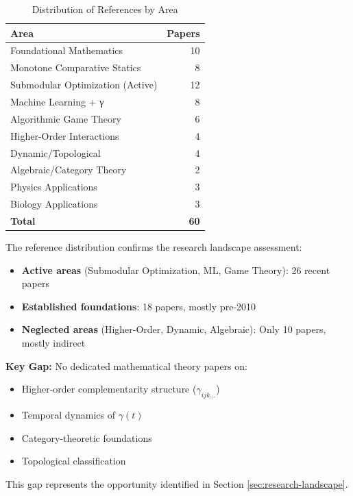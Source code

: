 \begin{table}[h]
\centering
\caption{Distribution of References by Area}
\label{tab:ref-distribution}
\renewcommand{\arraystretch}{1.2}
\begin{tabular}{@{}lr@{}}
\toprule
\textbf{Area} & \textbf{Papers} \\
\midrule
Foundational Mathematics & 10 \\
Monotone Comparative Statics & 8 \\
Submodular Optimization (Active) & 12 \\
Machine Learning + γ & 8 \\
Algorithmic Game Theory & 6 \\
Higher-Order Interactions & 4 \\
Dynamic/Topological & 4 \\
Algebraic/Category Theory & 2 \\
Physics Applications & 3 \\
Biology Applications & 3 \\
\midrule
\textbf{Total} & \textbf{60} \\
\bottomrule
\end{tabular}
\end{table}

\begin{tcolorbox}[colback=yellow!5!white,colframe=yellow!75!black,title=\textbf{Literature Gap Analysis}]
The reference distribution confirms the research landscape assessment:
\begin{itemize}[noitemsep]
    \item \textbf{Active areas} (Submodular Optimization, ML, Game Theory): 26 recent papers
    \item \textbf{Established foundations}: 18 papers, mostly pre-2010
    \item \textbf{Neglected areas} (Higher-Order, Dynamic, Algebraic): Only 10 papers, mostly indirect
\end{itemize}

\textbf{Key Gap:} No dedicated mathematical theory papers on:
\begin{itemize}[noitemsep]
    \item Higher-order complementarity structure ($\gamma_{ijk...}$)
    \item Temporal dynamics of $\gamma(t)$
    \item Category-theoretic foundations
    \item Topological classification
\end{itemize}

This gap represents the opportunity identified in Section \ref{sec:research-landscape}.
\end{tcolorbox}

